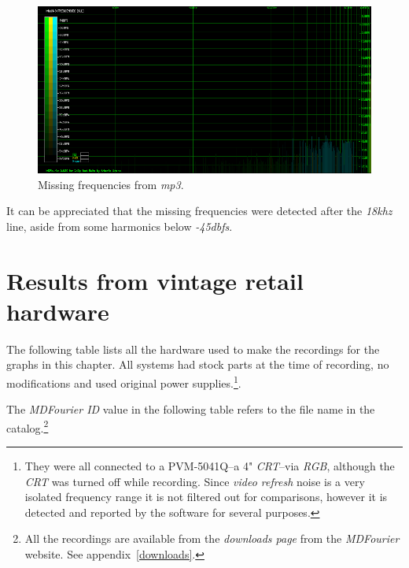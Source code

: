 \documentclass[10pt,a4paper]{report}
\newcommand{\ac}[1]{\textit{\mbox{\acrshort{#1}}}}
\newcommand{\khz}[1]{\textit{\mbox{#1\acrshort{khz}}}}
\newcommand{\db}[1]{\textit{\mbox{#1\acrshort{dbfs}}}}
\begin{document}
\begin{figure}[H]
	\centering
	\includegraphics[width=1.0\linewidth]{images/interpretation/Plot6-mp3-3.png}
	\caption[MP3 Missing]{Missing frequencies from \ac{mp3}.}
	\label{fig:plot6-mp3-3}
\end{figure}

It can be appreciated that the missing frequencies were detected after the \khz{18} line, aside from some harmonics below \db{-45}.

\chapter{Results from vintage retail hardware}
\label{results}

The following table lists all the hardware used to make the recordings for the graphs in this chapter. All systems had stock parts at the time of recording, no modifications and used original power supplies.\footnote{They were all connected to a PVM-5041Q--a 4" \textit{CRT}--via \textit{RGB}, although the \textit{CRT} was turned off while recording. Since \textit{video refresh} noise is a very isolated frequency range it is not filtered out for comparisons, however it is detected and reported by the software for several purposes.}. 

The \textit{MDFourier ID} value in the following table refers to the file name in the catalog.\footnote{All the recordings are available from the \textit{downloads page} from the \textit{MDFourier} website. See appendix~\ref{downloads}.}
\end{document}

